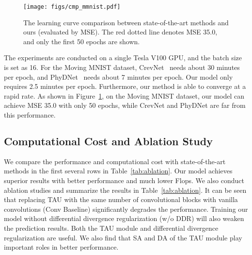 \documentclass[10pt,twocolumn,letterpaper]{article}
\begin{document}
\begin{figure}[htbp]
\vspace{-2mm}
\centering
\texttt{[image: figs/cmp\_mmnist.pdf]} 
\caption{The learning curve comparison between state-of-the-art methods and ours (evaluated by MSE). The red dotted line denotes MSE 35.0, and only the first 50 epochs are shown.}
\vspace{-2mm}
\label{fig:cmp_mmnist} 
\end{figure}

The experiments are conducted on a single Tesla V100 GPU, and the batch size is set as 16. For the Moving MNIST dataset, CrevNet~\cite{crevnet} needs about 30 minutes per epoch, and PhyDNet~\cite{phydnet} needs about 7 minutes per epoch. Our model only requires 2.5 minutes per epoch. Furthermore, our method is able to converge at a rapid rate. As shown in Figure~\ref{fig:cmp_mmnist}, on the Moving MNIST dataset, our model can achieve MSE 35.0 with only 50 epochs, while CrevNet and PhyDNet are far from this performance. 

\subsection{Computational Cost and Ablation Study}

We compare the performance and computational cost with state-of-the-art methods in the first several rows in Table~\ref{tab:ablation}. Our model achieves superior results with better performance and much lower Flops. We also conduct ablation studies and summarize the results in Table~\ref{tab:ablation}. It can be seen that replacing TAU with the same number of convolutional blocks with vanilla  convolutions (Conv Baseline) significantly degrades the performance. Training our model without differential divergence regularization (w/o DDR) will also weaken the prediction results. Both the TAU module and differential divergence regularization are useful. We also find that SA and DA of the TAU module play important roles in better performance.
\end{document}
